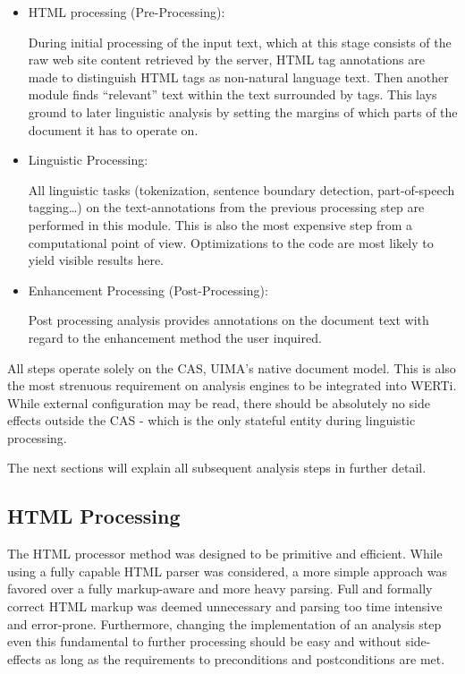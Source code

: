 \documentclass[12pt]{scrartcl}
\begin{document}
\begin{itemize}

\item{ HTML processing (Pre-Processing): } 

  During initial processing of the input text, which at this stage consists of
  the raw web site content retrieved by the server,  HTML tag annotations are
  made to distinguish HTML tags as non-natural language text. Then another
  module finds ``relevant'' text within the text surrounded by tags. This lays
  ground to later linguistic analysis by setting the margins of which parts of
  the document it has to operate on.

\item{ Linguistic Processing: } 
  
  All linguistic tasks (tokenization, sentence boundary detection,
  part-of-speech tagging\ldots{}) on the text-annotations from the previous
  processing step are performed in this module. This is also the most expensive
  step from a computational point of view. Optimizations to the code are most
  likely to yield visible results here.

\item{ Enhancement Processing (Post-Processing): }
  
  Post processing analysis provides annotations on the document text with regard
  to the enhancement method the user inquired.  \end{itemize}

All steps operate solely on the CAS, UIMA's native document model. This is also
the most strenuous requirement on analysis engines to be integrated into WERTi.
While external configuration may be read, there should be absolutely no side
effects outside the CAS - which is the only stateful entity during
linguistic processing.

The next sections will explain all subsequent analysis steps in further detail.

\subsection{HTML Processing}

The HTML processor method was designed to be primitive and efficient. While
using a fully capable HTML parser was considered, a more simple approach was
favored over a fully markup-aware and more heavy parsing.
Full and formally correct HTML markup was deemed unnecessary and
parsing too time intensive and error-prone.
Furthermore, changing the
implementation of an analysis step even this fundamental to further processing
should be easy and without side-effects as long as the requirements to
preconditions and postconditions are met.
\end{document}

